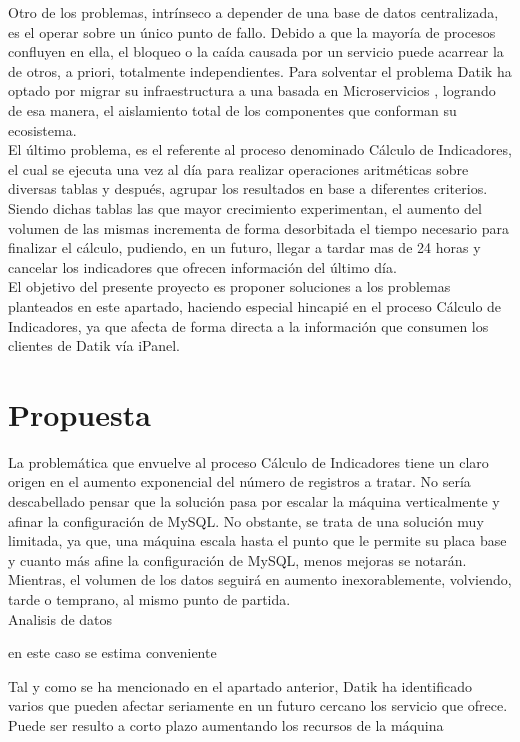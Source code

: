 Otro de los problemas, intrínseco a depender de una base de datos centralizada, es el operar sobre un único punto de fallo. Debido a que la mayoría de procesos confluyen en ella, el bloqueo o la caída causada por un servicio puede acarrear la de otros, a priori, totalmente independientes. Para solventar el problema Datik ha optado por migrar su infraestructura a una basada en Microservicios \cite{newman2015building}, logrando de esa manera, el aislamiento total de los componentes que conforman su ecosistema.\\ 

El último problema, es el referente al proceso denominado Cálculo de Indicadores, el cual se ejecuta una vez al día para realizar operaciones aritméticas sobre diversas tablas y después, agrupar los resultados en base a diferentes criterios. Siendo dichas tablas las que mayor crecimiento experimentan, el aumento del volumen de las mismas incrementa de forma desorbitada el tiempo necesario para finalizar el cálculo, pudiendo, en un futuro, llegar a tardar mas de 24 horas y cancelar los indicadores que ofrecen información del último día.\\

El objetivo del presente proyecto es proponer soluciones a los problemas planteados en este apartado, haciendo especial hincapié en el proceso Cálculo de Indicadores, ya que afecta de forma directa a la información que consumen los clientes de Datik vía iPanel.\\

\section{Propuesta}

La problemática que envuelve al proceso Cálculo de Indicadores tiene un claro origen en el aumento exponencial del número de registros a tratar. No sería descabellado pensar que la solución pasa por escalar la máquina verticalmente y afinar la configuración de MySQL. No obstante, se trata de una solución muy limitada, ya que, una máquina escala hasta el punto que le permite su placa base y cuanto más afine la configuración de MySQL, menos mejoras se notarán. Mientras, el volumen de los datos seguirá en aumento inexorablemente, volviendo, tarde o temprano, al mismo punto de partida.\\

Analisis de datos

en este caso se estima conveniente

Tal y como se ha mencionado en el apartado anterior, Datik ha identificado varios que pueden afectar seriamente en un futuro cercano los servicio que ofrece. Puede ser resulto a corto plazo aumentando los recursos de la máquina

